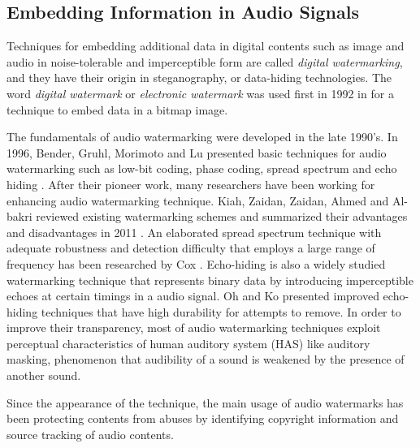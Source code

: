 \subsection{Embedding Information in Audio Signals}
Techniques for embedding additional data in digital contents such as image and audio in noise-tolerable and imperceptible form are called {\it digital watermarking}, and they have their origin in steganography, or data-hiding technologies.
The word {\it digital watermark} or {\it electronic watermark} was used first in 1992 in \cite{tirkel1993electronic} for a technique to embed data in a bitmap image.

The fundamentals of audio watermarking were developed in the late 1990's.
In 1996, Bender, Gruhl, Morimoto and Lu presented basic techniques for audio watermarking such as low-bit coding, phase coding, spread spectrum and echo hiding \cite{bender1996techniques}.
After their pioneer work, many researchers have been working for enhancing audio watermarking technique.
Kiah, Zaidan, Zaidan, Ahmed and Al-bakri reviewed existing watermarking schemes and summarized their advantages and disadvantages in 2011 \cite{mat2011review}.
An elaborated spread spectrum technique with adequate robustness and detection difficulty that employs a large range of frequency has been researched by Cox \cite{cox1997secure,cox2001digital}.
Echo-hiding is also a widely studied watermarking technique that represents binary data by introducing imperceptible echoes at certain timings in a audio signal. Oh \cite{oh2001new} and Ko \cite{ko2005time} presented improved echo-hiding techniques that have high durability for attempts to remove.
In order to improve their transparency, most of audio watermarking techniques exploit perceptual characteristics of human auditory system (HAS) like auditory masking, phenomenon that audibility of a sound is weakened by the presence of another sound.

Since the appearance of the technique, the main usage of audio watermarks has been
protecting contents from abuses by identifying copyright information and source tracking of audio contents.

